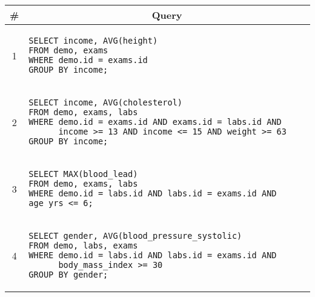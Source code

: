 \begin{tabular}{cl}
\toprule
\# & \multicolumn{1}{c}{Query} \\
\midrule
1 & 
\begin{minipage}{6in}
\begin{lstlisting}[breaklines]
SELECT income, AVG(height)
FROM demo, exams
WHERE demo.id = exams.id
GROUP BY income;
\end{lstlisting}
\end{minipage}{queryno} \label[query]{q1} \\
2 & 
\begin{minipage}{6in}
\begin{lstlisting}[breaklines]
SELECT income, AVG(cholesterol)
FROM demo, exams, labs
WHERE demo.id = exams.id AND exams.id = labs.id AND
      income >= 13 AND income <= 15 AND weight >= 63
GROUP BY income;
\end{lstlisting}
\end{minipage}
{queryno} \label[query]{q2} \\
3 & 
\begin{minipage}{6in}
\begin{lstlisting}[breaklines]
SELECT MAX(blood_lead)
FROM demo, exams, labs
WHERE demo.id = labs.id AND labs.id = exams.id AND age_yrs <= 6;
\end{lstlisting}
\end{minipage}{queryno} \label[query]{q3}\\
4 & 
\begin{minipage}{6in}
\begin{lstlisting}[breaklines]
SELECT gender, AVG(blood_pressure_systolic)
FROM demo, labs, exams
WHERE demo.id = labs.id AND labs.id = exams.id AND
      body_mass_index >= 30
GROUP BY gender;
\end{lstlisting}
\end{minipage}{queryno} \label[query]{q4}\\
\bottomrule
\end{tabular}
